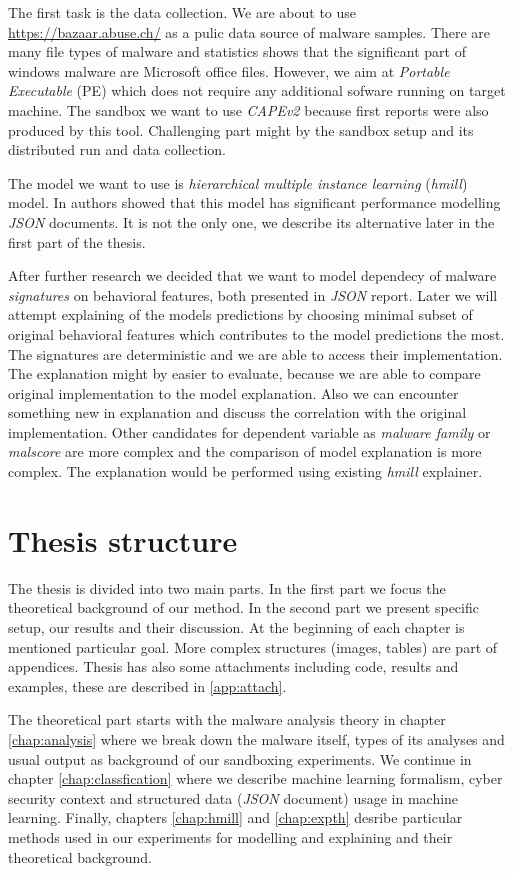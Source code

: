 The first task is the data collection. We are about to use \url{https://bazaar.abuse.ch/} as a pulic data source of malware samples. There are many file types of malware and statistics shows that the significant part of windows malware are Microsoft office files. However, we aim at \emph{Portable Executable} (PE) which does not require any additional sofware running on target machine. The sandbox we want to use \emph{CAPEv2} \cite{Cape} because first reports were also produced by this tool. Challenging part might by the sandbox setup and its distributed run and data collection.

The model we want to use is \emph{hierarchical multiple instance learning} (\emph{hmill}) model. In \cite{Mandlik2020} authors showed that this model has significant performance modelling \emph{JSON} documents. It is not the only one, we describe its alternative later in the first part of the thesis.

After further research we decided that we want to model dependecy of malware \emph{signatures} on behavioral features, both presented in \emph{JSON} report. Later we will attempt explaining of the models predictions by choosing minimal subset of original behavioral features which contributes to the model predictions the most. The signatures are deterministic and we are able to access their implementation. The explanation might by easier to evaluate, because we are able to compare original implementation to the model explanation. Also we can encounter something new in explanation and discuss the correlation with the original implementation. Other candidates for dependent variable as \emph{malware family} or \emph{malscore} are more complex and the comparison of model explanation is more complex. The explanation would be performed using existing \emph{hmill} explainer.

\section{Thesis structure}
The thesis is divided into two main parts. In the first part we focus the theoretical background of our method. In the second part we present specific setup, our results and their discussion. At the beginning of each chapter is mentioned particular goal. More complex structures (images, tables) are part of appendices. Thesis has also some attachments including code, results and examples, these are described in \ref{app:attach}.

The theoretical part starts with the malware analysis theory in chapter \ref{chap:analysis} where we break down the malware itself, types of its analyses and usual output as background of our sandboxing experiments. We continue in chapter \ref{chap:classfication} where we describe machine learning formalism, cyber security context and structured data (\emph{JSON} document) usage in machine learning. Finally, chapters \ref{chap:hmill} and \ref{chap:expth} desribe particular methods used in our experiments for modelling and explaining and their theoretical background.

